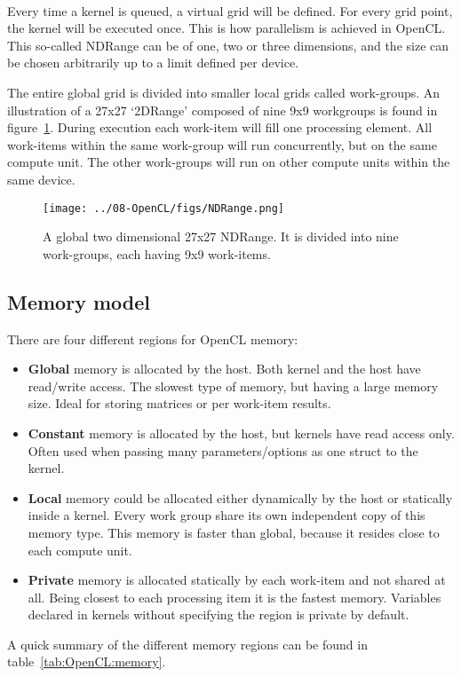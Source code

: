\paragraph*{}
Every time a kernel is queued, a virtual grid will be defined.
For every grid point, the kernel will be executed once.
This is how parallelism is achieved in OpenCL.
This so-called NDRange can be of one, two or three dimensions, and the size can be chosen arbitrarily up to a limit defined per device.

The entire global grid is divided into smaller local grids called work-groups.
An illustration of a 27x27 `2DRange' composed of nine 9x9 workgroups is found in figure~\ref{fig:OpenCL:ndrange}.
During execution each work-item will fill one processing element.
All work-items within the same work-group will run concurrently, but on the same compute unit. The other work-groups will run on other compute units within the same device.

\begin{figure}
\begin{center}
\texttt{[image: ../08-OpenCL/figs/NDRange.png]}
\caption{A global two dimensional 27x27 NDRange. It is divided into nine work-groups, each having 9x9 work-items.}
\label{fig:OpenCL:ndrange}
\end{center}
\end{figure}



\subsection{Memory model}
\label{sec:OpenCL:memmodel}
There are four different regions for OpenCL memory:
\begin{itemize}
\item \textbf{Global} memory is allocated by the host. Both kernel and the host have read/write access. The slowest type of memory, but having a large memory size. Ideal for storing matrices or per work-item results.
\item \textbf{Constant} memory is allocated by the host, but kernels have read access only. Often used when passing many parameters/options as one struct to the kernel.
\item \textbf{Local} memory could be allocated either dynamically by the host or statically inside a kernel. Every work group share its own independent copy of this memory type. This memory is faster than global, because it resides close to each compute unit. 
\item \textbf{Private} memory is allocated statically by each work-item and not shared at all. Being closest to each processing item it is the fastest memory. Variables declared in kernels without specifying the region is private by default.
\end{itemize}
A quick summary of the different memory regions can be found in table~\ref{tab:OpenCL:memory}.

